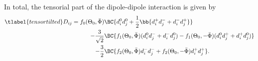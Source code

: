 In total, the tensorial part of the dipole-dipole interaction is given by
\begin{align} \tlabel{tensortilted}
    D_{ij} = f_0(\Theta_0, \bar \Phi) &\BC{ d_i^0 d_j^0 + \frac{1}{2}\bb{d_i^+ d_j^- + d_i^- d_j^+} } \\
    \qquad-\frac{3}{\sqrt{2}} &\BC{ f_1(\Theta_0, \bar \Phi)  (d_i^0 d_j^- + d_i^- d_j^0) - f_1(\Theta_0, -\bar \Phi) (d_i^0 d_j^+ + d_i^+ d_j^0) }\\
    \qquad-\frac{3}{2} &\BC{ f_2(\Theta_0, \bar \Phi) d_i^- d_j^- + f_2(\Theta_0, -\bar \Phi) d_i^+ d_j^+ }.
\end{align}


